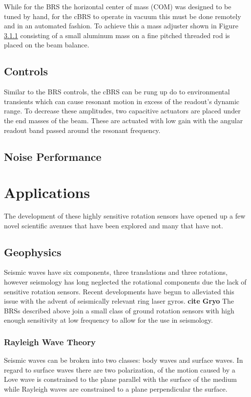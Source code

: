 \documentclass [12pt, proquest]{uwthesis}[2019]
\begin{document}
While for the BRS the horizontal center of mass (COM) was designed to be tuned by hand, for the cBRS to operate in vacuum this must be done remotely and in an automated fashion. To achieve this a mass adjuster shown in Figure \ref{} consisting of a small aluminum mass on a fine pitched threaded rod is placed on the beam balance.

\section{Controls}

Similar to the BRS controls, the cBRS can be rung up do to environmental transients which can cause resonant motion in excess of the readout's dynamic range. To decrease these amplitudes, two capacitive actuators are placed under the end masses of the beam. These are actuated with low gain with the angular readout band passed around the resonant frequency. 

\section{Noise Performance}

\chapter{Applications}
\quad The development of these highly sensitive rotation sensors have opened up a few novel scientific avenues that have been explored and many that have not.

\section{Geophysics}
Seismic waves have six components, three translations and three rotations, however seismology has long neglected the rotational components due the lack of sensitive rotation sensors. Recent developments have begun to alleviated this issue with the advent of seismically relevant ring laser gyros. \textbf{cite Gryo} The BRSs described above join a small class of ground rotation sensors with high enough sensitivity at low frequency to allow for the use in seismology.
\subsection{Rayleigh Wave Theory}

Seismic waves can be broken into two classes: body waves and surface waves. In regard to surface waves there are two polarization, of the motion caused by a Love wave is constrained to the plane parallel with the surface of the medium while Rayleigh waves are constrained to a plane perpendicular the surface. 
\end{document}
